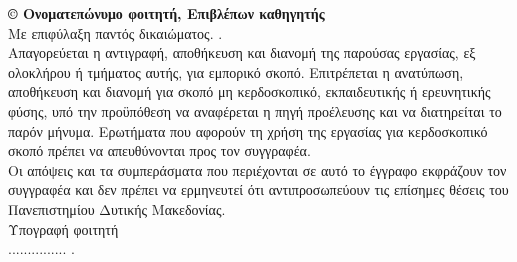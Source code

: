 \clearpage
\thispagestyle{empty}


{\normalsize \textbf{ © \the\year{} Ονοματεπώνυμο φοιτητή, Επιβλέπων καθηγητής}}\\
Με επιφύλαξη παντός δικαιώματος. .\\
\newline
Απαγορεύεται η αντιγραφή, αποθήκευση και διανομή της παρούσας εργασίας, εξ
ολοκλήρου ή τμήματος αυτής, για εμπορικό σκοπό. Επιτρέπεται η ανατύπωση,
αποθήκευση και διανομή για σκοπό μη κερδοσκοπικό, εκπαιδευτικής ή ερευνητικής
φύσης, υπό την προϋπόθεση να αναφέρεται η πηγή προέλευσης και να διατηρείται το
παρόν μήνυμα. Ερωτήματα που αφορούν τη χρήση της εργασίας για κερδοσκοπικό
σκοπό πρέπει να απευθύνονται προς τον συγγραφέα.\\
\newline
Οι απόψεις και τα συμπεράσματα που περιέχονται σε αυτό το έγγραφο εκφράζουν
τον συγγραφέα και δεν πρέπει να ερμηνευτεί ότι αντιπροσωπεύουν τις επίσημες
θέσεις του Πανεπιστημίου Δυτικής Μακεδονίας.\\

Υπογραφή φοιτητή\\ 

............... .

